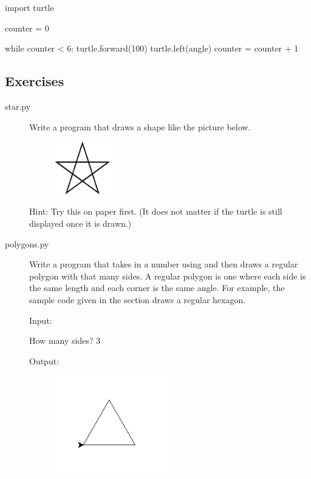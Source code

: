 \documentclass[11pt]{cselabheader}
\begin{document}
\begin{python3code}
import turtle

counter = 0

while counter < 6:
    turtle.forward(100)
    turtle.left(angle)
    counter = counter + 1
\end{python3code}

\pagebreak
\subsection{Exercises}
\label{subsec:turtleex}

\begin{description}

  \item[star.py] Write a program that draws a shape like the picture below.

    \begin{figure}[!ht]
      \centering
      \includegraphics[width=1.0in]{img/star}
    \end{figure}

    Hint: Try this on paper first. (It does not matter if the turtle is still
    displayed once it is drawn.)

  \item[polygons.py] Write a program that takes in a number using
     and then draws a regular polygon with that many sides. A
    regular polygon is one where each side is the same length and each corner is
    the same angle. For example, the sample code given in the section draws a
    regular hexagon.

    Input:

    \begin{bashcode}
How many sides? 3
    \end{bashcode}

    Output:
    \begin{figure}[h]
      \centering
      \includegraphics[width=2.0in]{img/triangle}
    \end{figure}


\end{description}
\end{document}
